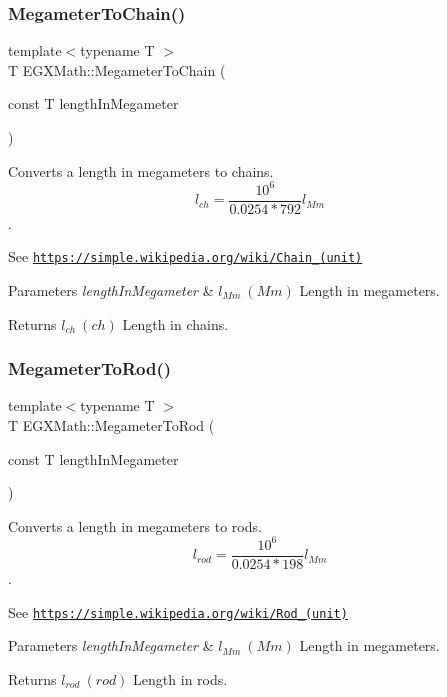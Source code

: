 \subsubsection{\texorpdfstring{Megameter\+To\+Chain()}{MegameterToChain()}}
{\footnotesize\ttfamily template$<$typename T $>$ \\
T E\+G\+X\+Math\+::\+Megameter\+To\+Chain (\begin{DoxyParamCaption}\item[{const T}]{length\+In\+Megameter }\end{DoxyParamCaption})}



Converts a length in megameters to chains. \[ l_{ch}= \frac{10^{6}}{0.0254 * 792} l_{Mm} \]. 

See \href{https://simple.wikipedia.org/wiki/Chain_(unit)}{\tt https\+://simple.\+wikipedia.\+org/wiki/\+Chain\+\_\+(unit)} 
\begin{DoxyParams}{Parameters}
{\em length\+In\+Megameter} & $ l_{Mm}\ (Mm)$ Length in megameters. \\
\hline
\end{DoxyParams}
\begin{DoxyReturn}{Returns}
$ l_{ch}\ (ch)$ Length in chains. 
\end{DoxyReturn}
\mbox{\label{group___e_g_x_math-_conversions-_length_conversions-_s_i-_megameter-_surveyors_ga46cf50c3f1310663facf0befbf3d71fb}} 
\subsubsection{\texorpdfstring{Megameter\+To\+Rod()}{MegameterToRod()}}
{\footnotesize\ttfamily template$<$typename T $>$ \\
T E\+G\+X\+Math\+::\+Megameter\+To\+Rod (\begin{DoxyParamCaption}\item[{const T}]{length\+In\+Megameter }\end{DoxyParamCaption})}



Converts a length in megameters to rods. \[ l_{rod}= \frac{10^{6}}{0.0254 * 198} l_{Mm} \]. 

See \href{https://simple.wikipedia.org/wiki/Rod_(unit)}{\tt https\+://simple.\+wikipedia.\+org/wiki/\+Rod\+\_\+(unit)} 
\begin{DoxyParams}{Parameters}
{\em length\+In\+Megameter} & $ l_{Mm}\ (Mm)$ Length in megameters. \\
\hline
\end{DoxyParams}
\begin{DoxyReturn}{Returns}
$ l_{rod}\ (rod)$ Length in rods. 
\end{DoxyReturn}
